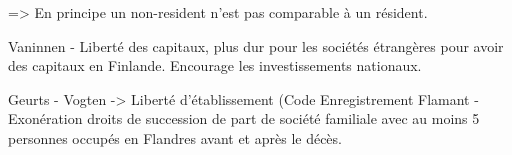 \documentclass{book}
\begin{document}
=> En principe un non-resident n'est pas comparable à un résident.


Vaninnen - Liberté des capitaux, plus dur pour les sociétés étrangères pour avoir des capitaux en Finlande. Encourage les investissements nationaux.

Geurts - Vogten -> Liberté d'établissement (Code Enregistrement Flamant - Exonération droits de succession de part de société familiale avec au moins 5 personnes occupés en Flandres avant et après le décès.

\nocite{*}

\end{document}
